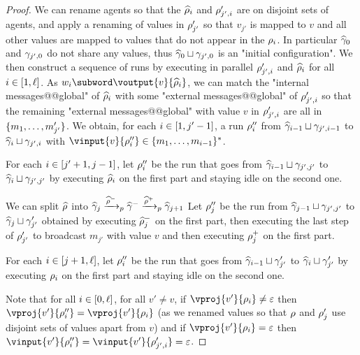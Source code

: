 \begin{proof}
We can rename agents so that the $\widehat{\rho}_i$ and $\rho'_{j',i}$ are on disjoint sets of agents, and apply a renaming of values in $\rho'_{j'}$ so that $v_{j'}$ is mapped to $v$ and all other values are mapped to values that do not appear in the $\rho_i$. In particular $\widehat{\gamma}_0$ and $\gamma_{j',0}$ do not share any values, thus $\widehat{\gamma}_0 \sqcup \gamma_{j',0}$ is an "initial configuration".
We then construct a sequence of runs by executing in parallel $\rho_{j',i}'$ and $\widehat{\rho}_i$ for all $i\in[1,\ell]$. As $w_i \subword \voutput{v}{\widehat{\run}_i}$, we can match the "internal messages@@global" of $\widehat{\rho}_i$ with some "external messages@@global" of $\rho'_{j',i}$ so that the remaining "external messages@@global" with value $v$ in $\rho'_{j',i}$ are all in $\{m_1, \ldots, m'_{j'}\}$. 
We obtain, for each $i \in [1,j'-1]$, a run $\rho''_i$ from $\widehat{\gamma}_{i-1} \sqcup \gamma_{j', i-1}$ to $\widehat{\gamma}_{i} \sqcup \gamma_{j', i}$ with $\vinput{v}{\run''_i} \in \set{m_1, \ldots, m_{i-1}}^*$. 

For each $i \in [j'+1,j-1]$, let $\rho''_i$ be the run that goes from $\widehat{\gamma}_{i-1} \sqcup \gamma_{j', j'}$ to $\widehat{\gamma}_{i} \sqcup \gamma_{j', j'}$ by executing $\widehat{\rho}_i$ on the first part and staying idle on the second one.

We can split $\widehat{\rho}$ into $\widehat{\gamma}_{j} \xrightarrow{\widehat{\rho}^-}_{p} \widehat{\gamma}^- \xrightarrow{\widehat{\rho}^+}_{p} \widehat{\gamma}_{j+1}$
Let $\rho''_j$ be the run from $\widehat{\gamma}_{j-1} \sqcup \gamma_{j', j'}$ to $\widehat{\gamma}_{j} \sqcup \gamma'_{j'}$ obtained by executing $\widehat{\rho}_{j}^-$ on the first part, then executing the last step of $\rho'_{j'}$ to broadcast $m_{j'}$ with value $v$ and then executing $\rho_{j}^+$ on the first part.

For each $i \in [j+1,\ell]$, let $\rho''_i$ be the run that goes from $\widehat{\gamma}_{i-1} \sqcup \gamma'_{j'}$ to $\widehat{\gamma}_{i} \sqcup \gamma'_{j'}$ by executing $\rho_i$ on the first part and staying idle on the second one.

Note that for all $i \in [0,\ell]$, for all $v' \neq v$, if $\vproj{v'}{\run_i} \neq \epsilon$ then $\vproj{v'}{\run''_i} = \vproj{v'}{\run_i}$ (as we renamed values so that $\rho$ and $\rho'_j$ use disjoint sets of values apart from $v$) and if $\vproj{v'}{\run_i} = \epsilon$ then $\vinput{v'}{\run''_i} = \vinput{v'}{\run'_{j',i}} = \epsilon$.


\end{proof}
